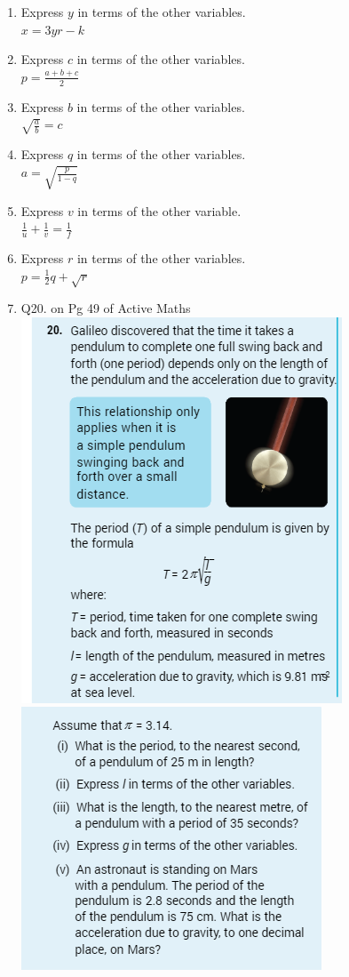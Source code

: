 \documentclass[a4paper,14pt]{extarticle}
\begin{document}
\begin{enumerate}
\begin{enumerate}
\item{Express $y$ in terms of the other variables.\\$x = 3yr - k$}
\newpage
\item{Express $c$ in terms of the other variables.\\$p = \frac{a+b+c}{2}$}
\vspace{10cm}
\item{Express $b$ in terms of the other variables.\\$\sqrt{\frac{a}{b}} = c$}
\newpage
\item{Express $q$ in terms of the other variables.\\$a = \sqrt{\frac{p}{1-q}}$}
\vspace{10cm}
\item{Express $v$ in terms of the other variable.\\$\frac{1}{u} + \frac{1}{v} = \frac{1}{f}$}
\newpage
\item{Express $r$ in terms of the other variables.\\$p = \frac{1}{2}q + \sqrt{r}$}
\vspace{10cm}
\item{Q20. on Pg 49 of Active Maths} \\[3pt]
\includegraphics[width=.7\linewidth]{q20part1}\\
\includegraphics[width=.7\linewidth]{q20part2}


\end{enumerate}
\end{enumerate}
\end{document}
